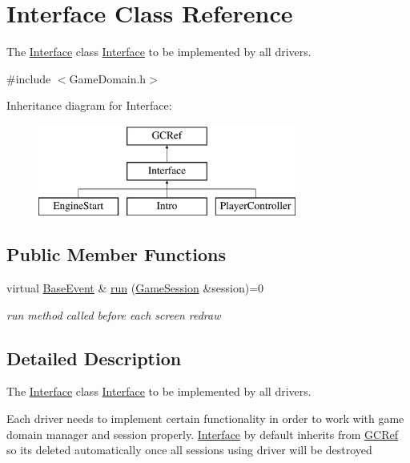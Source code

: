 \hypertarget{classInterface}{}\section{Interface Class Reference}
\label{classInterface}


The \hyperlink{classInterface}{Interface} class \hyperlink{classInterface}{Interface} to be implemented by all drivers.  




{\ttfamily \#include $<$Game\+Domain.\+h$>$}

Inheritance diagram for Interface\+:\begin{figure}[H]
\begin{center}
\leavevmode
\includegraphics[height=3.000000cm]{classInterface}
\end{center}
\end{figure}
\subsection*{Public Member Functions}
\begin{DoxyCompactItemize}
\item 
virtual \hyperlink{classBaseEvent}{Base\+Event} \& \hyperlink{classInterface_addff25eb2adf4221c2be4895597b49c1}{run} (\hyperlink{classGameSession}{Game\+Session} \&session)=0
\begin{DoxyCompactList}\small\item\em run method called before each screen redraw \end{DoxyCompactList}\end{DoxyCompactItemize}


\subsection{Detailed Description}
The \hyperlink{classInterface}{Interface} class \hyperlink{classInterface}{Interface} to be implemented by all drivers. 

Each driver needs to implement certain functionality in order to work with game domain manager and session properly. \hyperlink{classInterface}{Interface} by default inherits from \hyperlink{classGCRef}{G\+C\+Ref} so it\textquotesingle{}s deleted automatically once all sessions using driver will be destroyed 

